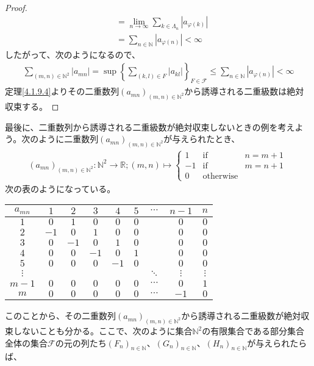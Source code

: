 \documentclass[dvipdfmx]{jsarticle}
\begin{document}
\begin{proof}
\begin{align*}
&= \lim_{n \rightarrow \infty}{\sum_{k \in \varLambda_{n}}\left| a_{\varphi(k)} \right|}\\
&= \sum_{n \in \mathbb{N}}\left| a_{\varphi(n)} \right| < \infty
\end{align*}
したがって、次のようになるので、
\begin{align*}
\sum_{(m,n) \in \mathbb{N}^{2}}\left| a_{mn} \right| = \sup\left\{ \sum_{(k,l) \in F}\left| a_{kl} \right| \right\}_{F \in \mathcal{F}} \leq \sum_{n \in \mathbb{N}}\left| a_{\varphi(n)} \right| < \infty
\end{align*}
定理\ref{4.1.9.4}よりその二重数列$\left( a_{mn} \right)_{(m,n) \in \mathbb{N}^{2}}$から誘導される二重級数は絶対収束する。
\end{proof}\par
最後に、二重数列から誘導される二重級数が絶対収束しないときの例を考えよう。次のように二重数列$\left( a_{mn} \right)_{(m,n) \in \mathbb{N}^{2}}$が与えられたとき、
\begin{align*}
\left( a_{mn} \right)_{(m,n) \in \mathbb{N}^{2}}:\mathbb{N}^{2} \rightarrow \mathbb{R};(m,n) \mapsto \left\{ \begin{matrix}
1 & \mathrm{if} & n = m + 1 \\
 - 1 & \mathrm{if} & m = n + 1 \\
0 & \mathrm{otherwise} & \  
\end{matrix} \right.\ 
\end{align*}
次の表のようになっている。
\begin{longtable}[c]{|c||c|c|c|c|c|c|c|c|}
\hline
$a_{mn}$ & $1$ & $2$ & $3$ & $4$ & $5$ & $\cdots$ & $n - 1$ & $n$ \\
\hline\hline
$1$ & $0$ & $1$ & $0$ & $0$ & $0$ & & $0$ & $0$ \\
\hline
$2$ & $- 1$ & $0$ & $1$ & $0$ & $0$ & & $0$ & $0$ \\
\hline
$3$ & $0$ & $- 1$ & $0$ & $1$ & $0$ & & $0$ & $0$ \\
\hline
$4$ & $0$ & $0$ & $- 1$ & $0$ & $1$ & & $0$ & $0$ \\
\hline
$5$ & $0$ & $0$ & $0$ & $- 1$ & $0$ & & $0$ & $0$ \\
\hline
$\vdots$ & & & & & & $\ddots$ & $\vdots$ & $\vdots$ \\
\hline
$m - 1$ & $0$ & $0$ & $0$ & $0$ & $0$ & $\cdots$ & $0$ & $1$ \\
\hline
$m$ & $0$ & $0$ & $0$ & $0$ & $0$ & $\cdots$ & $- 1$ & $0$ \\
\hline
\end{longtable}
このことから、その二重数列$\left( a_{mn} \right)_{(m,n) \in \mathbb{N}^{2}}$から誘導される二重級数が絶対収束しないことも分かる。ここで、次のように集合$\mathbb{N}^{2}$の有限集合である部分集合全体の集合$\mathcal{F}$の元の列たち$\left( F_{n} \right)_{n \in \mathbb{N}}$、$\left( G_{n} \right)_{n \in \mathbb{N}}$、$\left( H_{n} \right)_{n \in \mathbb{N}}$が与えられたらば、
\end{document}
